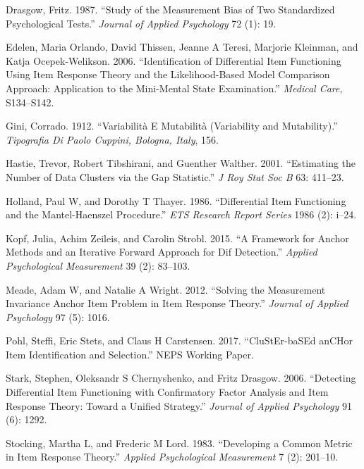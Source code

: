 \documentclass[
  11pt,
]{article}
\begin{document}
\leavevmode\hypertarget{ref-drasgow1987study}{}%
Drasgow, Fritz. 1987. ``Study of the Measurement Bias of Two Standardized Psychological Tests.'' \emph{Journal of Applied Psychology} 72 (1): 19.

\leavevmode\hypertarget{ref-edelen2006identification}{}%
Edelen, Maria Orlando, David Thissen, Jeanne A Teresi, Marjorie Kleinman, and Katja Ocepek-Welikson. 2006. ``Identification of Differential Item Functioning Using Item Response Theory and the Likelihood-Based Model Comparison Approach: Application to the Mini-Mental State Examination.'' \emph{Medical Care}, S134--S142.

\leavevmode\hypertarget{ref-gini1912variabilita}{}%
Gini, Corrado. 1912. ``Variabilità E Mutabilità (Variability and Mutability).'' \emph{Tipografia Di Paolo Cuppini, Bologna, Italy}, 156.

\leavevmode\hypertarget{ref-hastie2001estimating}{}%
Hastie, Trevor, Robert Tibshirani, and Guenther Walther. 2001. ``Estimating the Number of Data Clusters via the Gap Statistic.'' \emph{J Roy Stat Soc B} 63: 411--23.

\leavevmode\hypertarget{ref-holland1986differential}{}%
Holland, Paul W, and Dorothy T Thayer. 1986. ``Differential Item Functioning and the Mantel-Haenszel Procedure.'' \emph{ETS Research Report Series} 1986 (2): i--24.

\leavevmode\hypertarget{ref-kopf2015framework}{}%
Kopf, Julia, Achim Zeileis, and Carolin Strobl. 2015. ``A Framework for Anchor Methods and an Iterative Forward Approach for Dif Detection.'' \emph{Applied Psychological Measurement} 39 (2): 83--103.

\leavevmode\hypertarget{ref-meade2012solving}{}%
Meade, Adam W, and Natalie A Wright. 2012. ``Solving the Measurement Invariance Anchor Item Problem in Item Response Theory.'' \emph{Journal of Applied Psychology} 97 (5): 1016.

\leavevmode\hypertarget{ref-pohl2017cluster}{}%
Pohl, Steffi, Eric Stets, and Claus H Carstensen. 2017. ``CluStEr-baSEd anCHor Item Identification and Selection.'' NEPS Working Paper.

\leavevmode\hypertarget{ref-stark2006detecting}{}%
Stark, Stephen, Oleksandr S Chernyshenko, and Fritz Drasgow. 2006. ``Detecting Differential Item Functioning with Confirmatory Factor Analysis and Item Response Theory: Toward a Unified Strategy.'' \emph{Journal of Applied Psychology} 91 (6): 1292.

\leavevmode\hypertarget{ref-stocking1983developing}{}%
Stocking, Martha L, and Frederic M Lord. 1983. ``Developing a Common Metric in Item Response Theory.'' \emph{Applied Psychological Measurement} 7 (2): 201--10.
\end{document}
